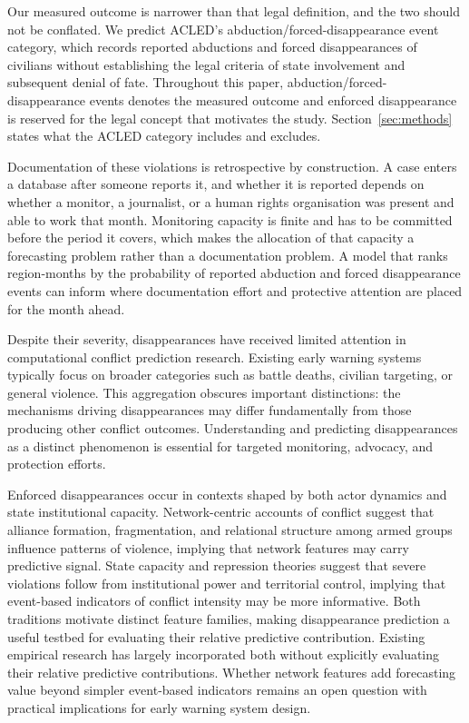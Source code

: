 \documentclass[pdflatex,sn-mathphys-num]{sn-jnl}%
\theoremstyle{thmstyleone}%
\theoremstyle{thmstyletwo}%
\theoremstyle{thmstylethree}%
\begin{document}
Our measured outcome is narrower than that legal definition, and the two should not be conflated. We predict ACLED's abduction/forced-disappearance event category, which records reported abductions and forced disappearances of civilians without establishing the legal criteria of state involvement and subsequent denial of fate. Throughout this paper, abduction/forced-disappearance events denotes the measured outcome and enforced disappearance is reserved for the legal concept that motivates the study. Section~\ref{sec:methods} states what the ACLED category includes and excludes.

Documentation of these violations is retrospective by construction. A case enters a database after someone reports it, and whether it is reported depends on whether a monitor, a journalist, or a human rights organisation was present and able to work that month. Monitoring capacity is finite and has to be committed before the period it covers, which makes the allocation of that capacity a forecasting problem rather than a documentation problem. A model that ranks region-months by the probability of reported abduction and forced disappearance events can inform where documentation effort and protective attention are placed for the month ahead.

Despite their severity, disappearances have received limited attention in computational conflict prediction research. Existing early warning systems typically focus on broader categories such as battle deaths, civilian targeting, or general violence. This aggregation obscures important distinctions: the mechanisms driving disappearances may differ fundamentally from those producing other conflict outcomes. Understanding and predicting disappearances as a distinct phenomenon is essential for targeted monitoring, advocacy, and protection efforts.

Enforced disappearances occur in contexts shaped by both actor dynamics and state institutional capacity. Network-centric accounts of conflict \cite{christia2012social,staniland2014networks} suggest that alliance formation, fragmentation, and relational structure among armed groups influence patterns of violence, implying that network features may carry predictive signal. State capacity and repression theories \cite{tilly1985war,davenport2007state,mann2005dark} suggest that severe violations follow from institutional power and territorial control, implying that event-based indicators of conflict intensity may be more informative. Both traditions motivate distinct feature families, making disappearance prediction a useful testbed for evaluating their relative predictive contribution. Existing empirical research has largely incorporated both without explicitly evaluating their relative predictive contributions. Whether network features add forecasting value beyond simpler event-based indicators remains an open question with practical implications for early warning system design.
\end{document}
